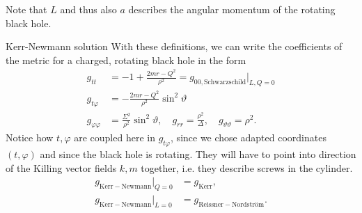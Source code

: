 Note that $L$ and thus also $a$ describes the angular momentum of the rotating black hole.
\begin{mybox}{Kerr-Newmann solution}
	With these definitions, we can write the coefficients of the metric for a
	charged, rotating black hole in the form
	\begin{align}
		g_{tt} &=-1 + \frac{2mr -Q^2}{\rho^2} = g_{00, \mathrm{Schwarzschild}} |_{L,Q =0}\\
		g_{t\varphi} &= -\frac{2mr-Q^2}{\rho^2}  \sin^2\vartheta \\
		g_{\varphi \varphi} &= \frac{\Sigma^2}{\rho^2} \sin^2\vartheta, \quad g_{rr} = \frac{\rho^2}{\Delta}, \quad g_{\vartheta \vartheta} = \rho^2.
	\end{align}
Notice how $t,\varphi$ are coupled here in $g_{t \varphi}$, since we chose adapted coordinates $(t,\varphi)$ and since the black hole is rotating. They will have to point into direction of the Killing vector fields $k,m$ together, i.e. they describe screws in the cylinder.
\begin{align}
 g_{\mathrm{Kerr-Newmann}} |_{Q=0} &= g_{\mathrm{Kerr}}, \\
  g_{\mathrm{Kerr-Newmann}} |_{L=0} &= g_{\mathrm{Reissner-Nordström}}.
\end{align}
\end{mybox}

